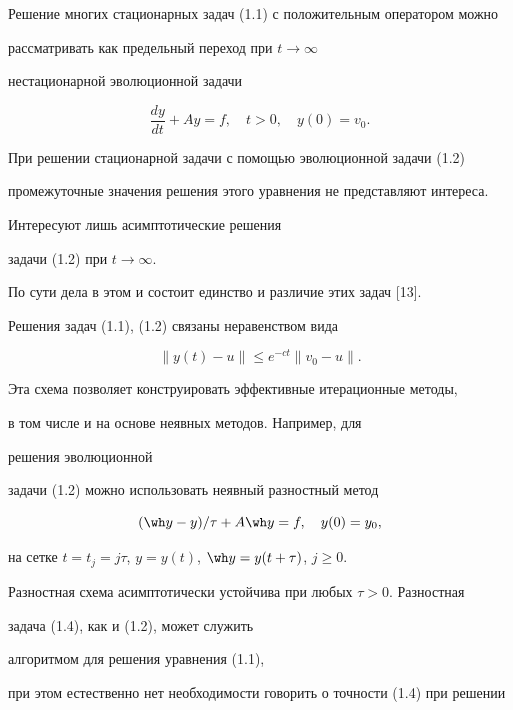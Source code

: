 Решение многих стационарных задач (1.1) с положительным оператором можно


рассматривать как предельный переход при $t\rightarrow \infty$


нестационарной эволюционной задачи


\begin{equation}


\frac {dy}{dt}+Ay=f,\quad t>0,\quad y(0)=v_0.


\end{equation}


При решении стационарной задачи с помощью эволюционной задачи (1.2)


промежуточные значения решения этого уравнения не представляют интереса.


Интересуют лишь асимптотические решения 


задачи (1.2) при $t\rightarrow \infty$.


По сути дела в этом и состоит единство и различие этих задач [13].





Решения задач (1.1), (1.2) связаны неравенством вида


\begin{equation}


\|y(t)-u\|\le e^{-ct} \|v_0-u\|.


\end{equation}


Эта схема позволяет конструировать эффективные итерационные методы, 


в том числе и на основе неявных методов. Например, для 


решения эволюционной


задачи (1.2) можно использовать неявный разностный метод


\begin{equation}


(\wh y-y)/\tau+A\wh y=f,\quad y(0)=y_0,


\end{equation}


на сетке $t=t_j=j\tau$, $y=y(t)$, $\wh y=y(t+\tau)$, $j\ge 0$.


Разностная схема асимптотически устойчива при любых $\tau>0$. Разностная


задача (1.4), как и (1.2), может служить 


алгоритмом для решения уравнения (1.1),


при этом естественно нет необходимости говорить о точности (1.4) при решении


